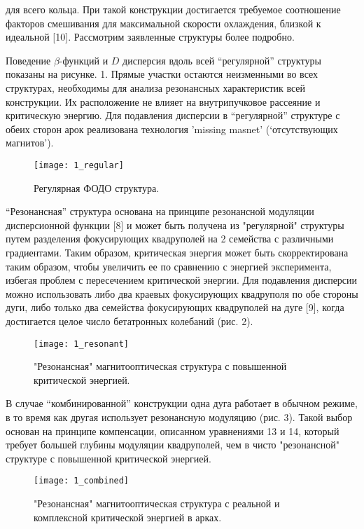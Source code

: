 \noindent для всего кольца. При такой конструкции достигается требуемое соотношение факторов смешивания для максимальной скорости охлаждения, близкой к идеальной [10]. Рассмотрим заявленные структуры более подробно.

\noindent Поведение $\beta$-функций и $D$ дисперсия вдоль всей “регулярной” структуры показаны на рисунке. 1. Прямые участки остаются неизменными во всех структурах, необходимы для анализа резонансных характеристик всей конструкции. Их расположение не влияет на внутрипучковое рассеяние и критическую энергию. Для подавления дисперсии в “регулярной” структуре с обеих сторон арок реализована технология 'missing masnet' (‘отсутствующих магнитов’).

\begin{figure}[!h]
  \centering
   \texttt{[image: 1\_regular]}
   \caption{Регулярная ФОДО структура.}
   \label{fig:1_regular}
\end{figure}

\noindent “Резонансная” структура основана на принципе резонансной модуляции дисперсионной функции [8] и может быть получена из "регулярной" структуры путем разделения фокусирующих квадруполей на 2 семейства с различными градиентами. Таким образом, критическая энергия может быть скорректирована таким образом, чтобы увеличить ее по сравнению с энергией эксперимента, избегая проблем с пересечением критической энергии. Для подавления дисперсии можно использовать либо два краевых фокусирующих квадруполя по обе стороны дуги, либо только два семейства фокусирующих квадруполей на дуге [9], когда достигается целое число бетатронных колебаний (рис. 2).

\begin{figure}[!h]
  \centering
   \texttt{[image: 1\_resonant]}
   \caption{"Резонансная" магнитооптическая структура с повышенной критической энергией.}
   \label{fig:1_resonant}
\end{figure}

\noindent В случае “комбинированной” конструкции одна дуга работает в обычном режиме, в то время как другая использует резонансную модуляцию (рис. 3). Такой выбор основан на принципе компенсации, описанном уравнениями 13 и 14, который требует большей глубины модуляции квадруполей, чем в чисто "резонансной" структуре с повышенной критической энергией.

\begin{figure}[!h]
  \centering
   \texttt{[image: 1\_combined]}
   \caption{"Резонансная" магнитооптическая структура с реальной и комплексной критической энергией в арках.}
   \label{fig:1_combined}
\end{figure}

